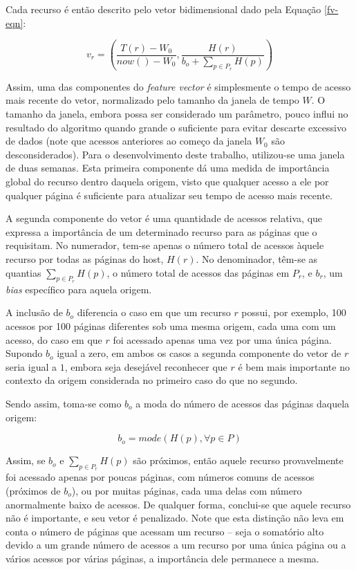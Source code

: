\documentclass[10pt,twocolumn,letterpaper]{article}
\begin{document}
Cada recurso é então descrito pelo vetor bidimensional dado pela Equação \ref{fv-eqn}:

\begin{equation}
\label{fv-eqn}
v_{r} = \left( \frac{T(r) - W_0}{now() - W_0}, \frac{H(r)}{b_{o} + \sum_{p \in P_{r}} H(p)} \right)
\end{equation}

Assim, uma das componentes do \emph{feature vector} é simplesmente o tempo de acesso mais recente do vetor, normalizado pelo tamanho da janela de tempo $W$. O tamanho da janela, embora possa ser considerado um parâmetro, pouco influi no resultado do algoritmo quando grande o suficiente para evitar descarte excessivo de dados (note que acessos anteriores ao começo da janela $W_0$ são desconsiderados). Para o desenvolvimento deste trabalho, utilizou-se uma janela de duas semanas. Esta primeira componente dá uma medida de importância global do recurso dentro daquela origem, visto que qualquer acesso a ele por qualquer página é suficiente para atualizar seu tempo de acesso mais recente.

A segunda componente do vetor é uma quantidade de acessos relativa, que expressa a importância de um determinado recurso para as páginas que o requisitam. No numerador, tem-se apenas o número total de acessos àquele recurso por todas as páginas do host, $H(r)$. No denominador, têm-se as quantias $\sum_{p \in P_{r}} H(p)$, o número total de acessos das páginas em $P_{r}$, e $b_{r}$, um \emph{bias} específico para aquela origem.

A inclusão de $b_{o}$ diferencia o caso em que um recurso $r$ possui, por exemplo, 100 acessos por 100 páginas diferentes sob uma mesma origem, cada uma com um acesso, do caso em que $r$ foi acessado apenas uma vez por uma única página. Supondo $b_{o}$ igual a zero, em ambos os casos a segunda componente do vetor de $r$ seria igual a $1$, embora seja desejável reconhecer que $r$ é bem mais importante no contexto da origem considerada no primeiro caso do que no segundo.

Sendo assim, toma-se como $b_{o}$ a moda do número de acessos das páginas daquela origem:

\begin{equation}
b_{o} = mode(H(p), \forall p \in P)
\end{equation}

Assim, se $b_{o}$ e $\sum_{p \in P_{r}} H(p)$ são próximos, então aquele recurso provavelmente foi acessado apenas por poucas páginas, com números comuns de acessos (próximos de $b_{o}$), ou por muitas páginas, cada uma delas com número anormalmente baixo de acessos. De qualquer forma, conclui-se que aquele recurso não é importante, e seu vetor é penalizado. Note que esta distinção não leva em conta o número de páginas que acessam um recurso -- seja o somatório alto devido a um grande número de acessos a um recurso por uma única página ou a vários acessos por várias páginas, a importância dele permanece a mesma.
\end{document}
